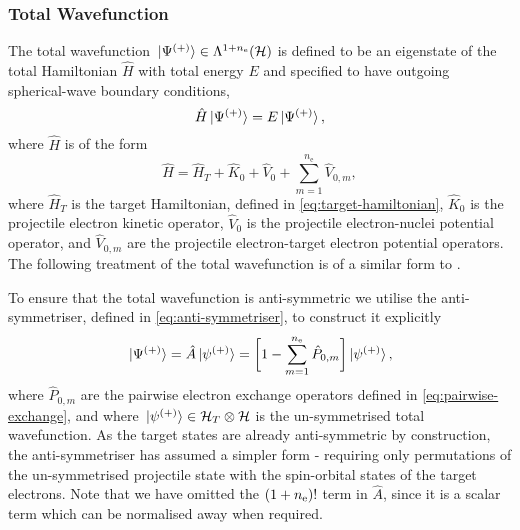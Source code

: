 \documentclass[draft]{article}
\begin{document}
\subsubsection{Total Wavefunction}
\label{sec:total-wavefunction}

The total wavefunction
$\ket*{\Psi^{(+)}} \in \Lambda^{1 + n_{\mathrm{e}}}(\mathcal{H})$ is
defined to be an eigenstate of the total Hamiltonian $\hat{H}$ with total
energy $E$ and specified to have outgoing spherical-wave boundary conditions,
\begin{equation}
  \label{eq:total-wavefunction}
  \hat{H}
  \ket*{\Psi^{\lr{+}}}
  =
  E
  \ket*{\Psi^{\lr{+}}}
  ,
\end{equation}
where $\hat{H}$ is of the form
\begin{equation}
  \label{eq:total-hamiltonian}
  \hat{H}
  =
  \hat{H}_{T}
  +
  \hat{K}_{0}
  +
  \hat{V}_{0}
  +
  \sum_{m = 1}^{n_{\mathrm{e}}}
  \hat{V}_{0, m}
  ,
\end{equation}
where $\hat{H}_{T}$ is the target Hamiltonian, defined in
\autoref{eq:target-hamiltonian}, $\hat{K}_{0}$ is the projectile electron
kinetic operator, $\hat{V}_{0}$ is the projectile electron-nuclei potential
operator, and $\hat{V}_{0, m}$ are the projectile electron-target electron
potential operators.
The following treatment of the total wavefunction is of a similar form to
\cite[202-204]{AJP_BRAY1996}.

To ensure that the total wavefunction is anti-symmetric we utilise the
anti-symmetriser, defined in \autoref{eq:anti-symmetriser}, to construct it
explicitly
\begin{equation}
  \label{eq:total-wavefunction-antisymmetrisation}
  \ket*{\Psi^{\lr{+}}}
  =
  \hat{A}
  \ket*{\psi^{\lr{+}}}
  =
  \lrsq[\bigg]
  {
    1
    -
    \sum_{m = 1}^{n_{\mathrm{e}}}
    \hat{P}_{0, m}
  }
  \ket*{\psi^{\lr{+}}}
  ,
\end{equation}
where $\hat{P}_{0, m}$ are the pairwise electron exchange operators defined in
\autoref{eq:pairwise-exchange}, and where
$\ket*{\psi^{(+)}} \in \mathcal{H}_{T} \otimes \mathcal{H}$ is the
un-symmetrised total wavefunction.
As the target states are already anti-symmetric by construction, the
anti-symmetriser has assumed a simpler form - requiring only permutations
of the un-symmetrised projectile state with the spin-orbital states of the
target electrons.
Note that we have omitted the $(1 + n_{\mathrm{e}})!$ term in $\hat{A}$,
since it is a scalar term which can be normalised away when required.
\end{document}
